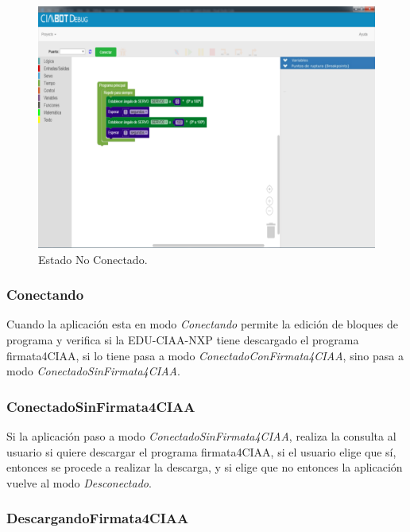 \begin{figure}[!htbp]
	\begin{center}  %
		\includegraphics[scale=.35]{./Figures/debug-inicio.png}
		\par\caption{Estado No Conectado.}\label{fig:desconectado}
	\end{center}
\end{figure}


\subsubsection{Conectando}
\label{subsubsec:Conectando}

Cuando la aplicación esta en modo \emph{Conectando} permite la edición de bloques de programa y verifica si la EDU-CIAA-NXP tiene descargado el programa firmata4CIAA, si lo tiene pasa a modo \emph{ConectadoConFirmata4CIAA}, sino pasa a modo \emph{ConectadoSinFirmata4CIAA}.

\subsubsection{ConectadoSinFirmata4CIAA}
\label{subsubsec:ConectadoSinFirmata4CIAA}

Si la aplicación paso a modo \emph{ConectadoSinFirmata4CIAA}, realiza la consulta al usuario si quiere descargar el programa firmata4CIAA, si el usuario elige que sí, entonces se procede a realizar la descarga, y si elige que no entonces la aplicación vuelve al modo \emph{Desconectado}.

\subsubsection{DescargandoFirmata4CIAA}
\label{subsubsec:Conectando}

